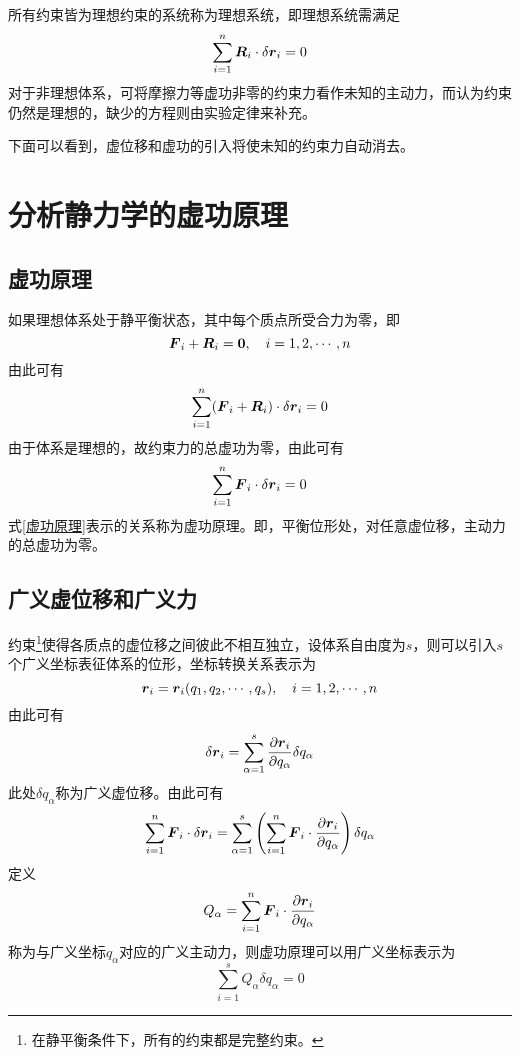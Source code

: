 所有约束皆为理想约束的系统称为{\heiti 理想系统}，即理想系统需满足
\begin{equation*}
	\sum_{i=1}^n \boldsymbol{R}_i \cdot \delta \boldsymbol{r}_i = 0
\end{equation*}
对于非理想体系，可将摩擦力等虚功非零的约束力看作未知的主动力，而认为约束仍然是理想的，缺少的方程则由实验定律来补充。

下面可以看到，虚位移和虚功的引入将使未知的约束力自动消去。

\section{分析静力学的虚功原理}

\subsection{虚功原理}

如果理想体系处于静平衡状态，其中每个质点所受合力为零，即
\begin{equation*}
	\boldsymbol{F}_i + \boldsymbol{R}_i = \boldsymbol{0},\quad i = 1,2,\cdots,n
\end{equation*}
由此可有
\begin{equation*}
	\sum_{i=1}^n (\boldsymbol{F}_i+\boldsymbol{R}_i) \cdot \delta \boldsymbol{r}_i = 0
\end{equation*}
由于体系是理想的，故约束力的总虚功为零，由此可有
\begin{equation}
	\sum_{i=1}^n \boldsymbol{F}_i \cdot \delta \boldsymbol{r}_i = 0
	\label{虚功原理}
\end{equation}
式\eqref{虚功原理}表示的关系称为{\heiti 虚功原理}。即，平衡位形处，对任意虚位移，主动力的总虚功为零。

\subsection{广义虚位移和广义力}

约束\footnote{在静平衡条件下，所有的约束都是完整约束。}使得各质点的虚位移之间彼此不相互独立，设体系自由度为$s$，则可以引入$s$个广义坐标表征体系的位形，坐标转换关系表示为
\begin{equation}
	\boldsymbol{r}_i = \boldsymbol{r}_i(q_1,q_2,\cdots,q_s),\quad i = 1,2,\cdots,n
\end{equation}
由此可有
\begin{equation}
	\delta \boldsymbol{r}_i = \sum_{\alpha=1}^s \frac{\partial \boldsymbol{r}_i}{\partial q_\alpha} \delta q_\alpha
\end{equation}
此处$\delta q_\alpha$称为{\heiti 广义虚位移}。由此可有
\begin{equation*}
	\sum_{i=1}^n \boldsymbol{F}_i \cdot \delta \boldsymbol{r}_i = \sum_{\alpha=1}^s \left(\sum_{i=1}^n \boldsymbol{F}_i \cdot \frac{\partial \boldsymbol{r}_i}{\partial q_\alpha}\right)\delta q_\alpha
\end{equation*}
定义
\begin{equation}
	Q_\alpha = \sum_{i=1}^n \boldsymbol{F}_i \cdot \frac{\partial \boldsymbol{r}_i}{\partial q_\alpha}
\end{equation}
称为与广义坐标$q_\alpha$对应的广义主动力，则虚功原理可以用广义坐标表示为
\begin{equation}
	\sum_{i=1}^s Q_\alpha \delta q_\alpha = 0
	\label{虚功原理的广义表示}
\end{equation}

